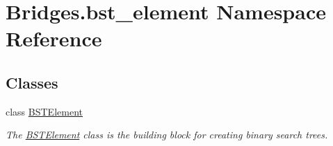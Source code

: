 \hypertarget{namespace_bridges_1_1bst__element}{}\section{Bridges.\+bst\+\_\+element Namespace Reference}
\label{namespace_bridges_1_1bst__element}
\subsection*{Classes}
\begin{DoxyCompactItemize}
\item 
class \mbox{\hyperlink{class_bridges_1_1bst__element_1_1_b_s_t_element}{B\+S\+T\+Element}}
\begin{DoxyCompactList}\small\item\em The \mbox{\hyperlink{class_bridges_1_1bst__element_1_1_b_s_t_element}{B\+S\+T\+Element}} class is the building block for creating binary search trees. \end{DoxyCompactList}\end{DoxyCompactItemize}
